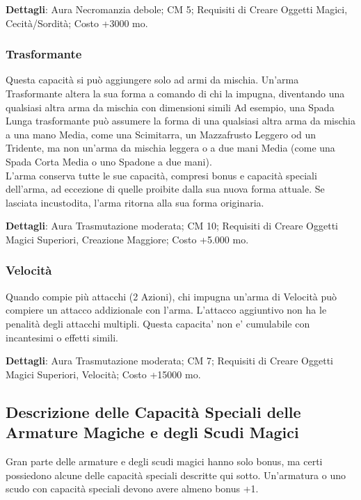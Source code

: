 \begin{multicols}{2}
\textbf{Dettagli}: Aura Necromanzia debole; CM 5; Requisiti di Creare Oggetti Magici, Cecità/Sordità; Costo +3000 mo.

\subsubsection{Trasformante}

Questa capacità si può aggiungere solo ad armi da mischia. Un'arma Trasformante altera la sua forma a comando di chi la impugna, diventando una qualsiasi altra arma da mischia con dimensioni simili Ad esempio, una Spada Lunga trasformante può assumere la forma di una qualsiasi altra arma da mischia a una mano Media, come una Scimitarra, un Mazzafrusto Leggero od un Tridente, ma non un'arma da mischia leggera o a due mani Media (come una Spada Corta Media o uno Spadone a due mani).\\
L'arma conserva tutte le sue capacità, compresi bonus e capacità speciali dell'arma, ad eccezione di quelle proibite dalla sua nuova forma attuale. Se lasciata incustodita, l'arma ritorna alla sua forma originaria.

\textbf{Dettagli}: Aura Trasmutazione moderata; CM 10; Requisiti di Creare Oggetti Magici Superiori, Creazione Maggiore; Costo +5.000 mo.

\subsubsection{Velocità}

Quando compie più attacchi (2 Azioni), chi impugna un'arma di Velocità può compiere un attacco addizionale con l'arma. L'attacco aggiuntivo non ha le penalità degli attacchi multipli. Questa capacita' non e' cumulabile con incantesimi o effetti simili.

\textbf{Dettagli}: Aura Trasmutazione moderata; CM 7; Requisiti di Creare Oggetti Magici Superiori, Velocità; Costo +15000 mo.

\subsection{Descrizione delle Capacità Speciali delle Armature Magiche e degli Scudi Magici}

Gran parte delle armature e degli scudi magici hanno solo bonus, ma certi possiedono alcune delle capacità speciali descritte qui sotto. Un'armatura o uno scudo con capacità speciali devono avere almeno bonus +1.


\end{multicols}
